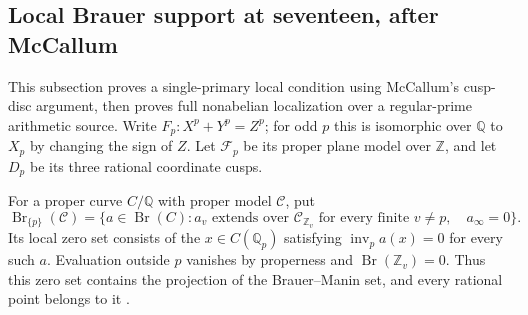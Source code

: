 \subsection{Local Brauer support at seventeen, after McCallum}
\label{subsec:seventeen-local-brauer}

This subsection proves a single-primary local condition using
McCallum's cusp-disc argument, then proves full nonabelian localization
over a regular-prime arithmetic source.  Write $F_p:X^p+Y^p=Z^p$; for odd $p$ this is isomorphic over
$\mathbb Q$ to $X_p$ by changing the sign of $Z$.  Let $\mathcal F_p$
be its proper plane model over $\mathbb Z$, and let $D_p$ be its three
rational coordinate cusps.

For a proper curve $C/\mathbb Q$ with proper model $\mathcal C$, put
\[
 \operatorname{Br}_{\{p\}}(\mathcal C)
 =\{a\in\operatorname{Br}(C):
 a_v\text{ extends over }\mathcal C_{\mathbb Z_v}
 \text{ for every finite }v\ne p,\quad a_\infty=0\}.
\]
Its local zero set consists of the $x\in C(\mathbb Q_p)$ satisfying
$\operatorname{inv}_p a(x)=0$ for every such $a$.  Evaluation outside
$p$ vanishes by properness and $\operatorname{Br}(\mathbb Z_v)=0$.
Thus this zero set contains the projection of the Brauer--Manin set,
and every rational point belongs to it
\citep[\S1, pp.~393--394]{McCallum2001Brauer}.

